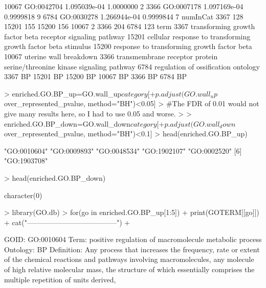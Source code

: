 \documentclass[a4paper,11pt]{article}
\begin{document}
\begin{Schunk}
\begin{Soutput}
10067 GO:0042704            1.095039e-04                1.0000000          2
3366  GO:0007178            1.097169e-04                0.9999818          9
6784  GO:0030278            1.266944e-04                0.9999844          7
      numInCat
3367       128
15201      155
15200      156
10067        2
3366       204
6784       123
                                                                          term
3367                transforming growth factor beta receptor signaling pathway
15201            cellular response to transforming growth factor beta stimulus
15200                              response to transforming growth factor beta
10067                                                   uterine wall breakdown
3366  transmembrane receptor protein serine/threonine kinase signaling pathway
6784                                                regulation of ossification
      ontology
3367        BP
15201       BP
15200       BP
10067       BP
3366        BP
6784        BP
\end{Soutput}
\begin{Sinput}
> enriched.GO.BP_up=GO.wall_up$category[
+   p.adjust(GO.wall_up$over_represented_pvalue, method="BH")<0.05]
> #The FDR of 0.01 would not give many results here, so I had to use 0.05 and worse.
> 
> enriched.GO.BP_down=GO.wall_down$category[
+   p.adjust(GO.wall_down$over_represented_pvalue, method="BH")<0.1]
> head(enriched.GO.BP_up)
\end{Sinput}
\begin{Soutput}
[1] "GO:0010604" "GO:0009893" "GO:0048534" "GO:1902107" "GO:0002520"
[6] "GO:1903708"
\end{Soutput}
\begin{Sinput}
> head(enriched.GO.BP_down)
\end{Sinput}
\begin{Soutput}
character(0)
\end{Soutput}
\begin{Sinput}
> library(GO.db)
> for(go in enriched.GO.BP_up[1:5]){
+ print(GOTERM[[go]])
+ cat("--------------------------------------\n")
+ }
\end{Sinput}
\begin{Soutput}
GOID: GO:0010604
Term: positive regulation of macromolecule metabolic process
Ontology: BP
Definition: Any process that increases the frequency, rate or extent of
    the chemical reactions and pathways involving macromolecules, any
    molecule of high relative molecular mass, the structure of which
    essentially comprises the multiple repetition of units derived,

\end{Soutput}
\end{Schunk}
\end{document}

